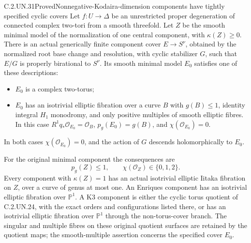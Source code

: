 \begin{statement}{C.2.UN.31}{Proved}{Nonnegative-Kodaira-dimension components have tightly specified cyclic covers}
Let $f:U\to\Delta$ be an unrestricted proper degeneration
of connected complex two-tori from a smooth threefold.
Let $Z$ be the smooth minimal model of the normalization
of one central component, with $\kappa(Z)\ge0$.
There is an actual generically finite component cover
$E\to S^\nu$, obtained by the normalized root base change
and resolution, with cyclic stabilizer $G$, such that
$E/G$ is properly birational to $S^\nu$. Its smooth
minimal model $E_0$ satisfies one of these descriptions:

\begin{itemize}
\item $E_0$ is a complex two-torus;
\item $E_0$ has an isotrivial elliptic fibration over a
curve $B$ with $g(B)\le1$, identity integral $H_1$
monodromy, and only positive multiples of smooth
elliptic fibres. In this case
$R^1q_*\mathcal O_{E_0}=\mathcal O_B$,
$p_g(E_0)=g(B)$, and $\chi(\mathcal O_{E_0})=0$.
\end{itemize}
In both cases $\chi(\mathcal O_{E_0})=0$, and the
action of $G$ descends holomorphically to $E_0$.

For the original minimal component the consequences are
\[
 p_g(Z)\le1,
 \qquad \chi(\mathcal O_Z)\in\{0,1,2\}.
                                                               \tag{C.CS.1}
\]
Every component with $\kappa(Z)=1$ has an actual
isotrivial elliptic Iitaka fibration on $Z$, over a
curve of genus at most one. An Enriques component
has an isotrivial elliptic fibration over $\mathbb P^1$.
A K3 component is either the cyclic torus quotient
of C.2.UN.24, with the exact orders and configurations
listed there, or has an isotrivial elliptic fibration
over $\mathbb P^1$ through the non-torus-cover branch.
The singular and multiple fibres on these original
quotient surfaces are retained by the quotient maps;
the smooth-multiple assertion concerns the specified
cover $E_0$.
\end{statement}


